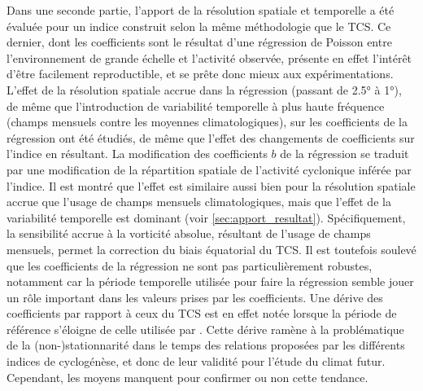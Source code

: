 \documentclass[../main.tex]{subfiles}
\begin{document}
Dans une seconde partie, l'apport de la résolution spatiale et temporelle a été évaluée pour un indice construit selon la même méthodologie que le TCS. Ce
dernier, dont les coefficients sont le résultat d'une régression de Poisson entre l'environnement de grande échelle et l'activité observée, présente en effet
l'intérêt d'être facilement reproductible, et se prête donc mieux aux expérimentations. L'effet de la résolution spatiale accrue dans la régression (passant de
\ang{2.5} à \ang{1}), de même que l'introduction de variabilité temporelle à plus haute fréquence (champs mensuels contre les moyennes climatologiques), sur les
coefficients de la régression ont été étudiés, de même que l'effet des changements de coefficients sur l'indice en résultant. La modification des coefficients
$b$ de la régression se traduit par une modification de la répartition spatiale de l'activité cyclonique inférée par l'indice. Il est montré que l'effet est
similaire aussi bien pour la résolution spatiale accrue que l'usage de champs mensuels climatologiques, mais que l'effet de la variabilité temporelle est
dominant (voir \cref{sec:apport_resultat}). Spécifiquement, la sensibilité accrue à la vorticité absolue, résultant de l'usage de champs mensuels, permet la
correction du biais équatorial du TCS. Il est toutefois soulevé que les coefficients de la régression ne sont pas particulièrement robustes, notamment car la
période temporelle utilisée pour faire la régression semble jouer un rôle important dans les valeurs prises par les coefficients. Une dérive des coefficients
par rapport à ceux du TCS est en effet notée lorsque la période de référence s'éloigne de celle utilisée par \textcite{tippett_poisson_2011}. Cette dérive
ramène à la problématique de la (non-)stationnarité dans le temps des relations proposées par les différents indices de cyclogénèse, et donc de leur validité
pour l'étude du climat futur. Cependant, les moyens manquent pour confirmer ou non cette tendance.
\end{document}

